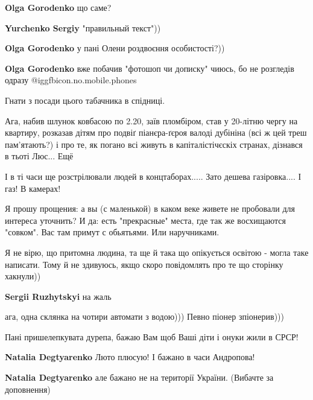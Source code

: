 \begin{itemize}
\begin{itemize} %
\textbf{Olga Gorodenko} що саме?

\textbf{Yurchenko Sergiy} "правильный текст"))

\textbf{Olga Gorodenko} у пані Олени роздвоєння особистості?))

\textbf{Olga Gorodenko} вже побачив "фотошоп чи дописку" чиюсь, бо не розгледів одразу  @igg{fbicon.no.mobile.phones} 
\end{itemize} %

 
Гнати з посади цього табачника в спідниці.

Ага, набив шлунок ковбасою по 2.20, заїв пломбіром, став у 20-літню чергу на квартиру, розказав дітям про подвіґ піанєра-ґєроя валоді дубініна (всі ж цей треш пам'ятають?) і про те, як погано всі живуть в капіталістічєскіх странах, дізнався в тьоті Люс... Ещё

І в ті часи ще розстрілювали людей в концтаборах..... Зато дешева газіровка.... І газ! В камерах!

Я прошу прощения: а вы (с маленькой) в каком веке живете не пробовали для интереса уточнить?
И да: есть "прекрасные" места, где так же восхищаются "совком". Вас там примут с обьятьями.
Или наручниками.

Я не вірю, що притомна людина, та ще й така що опікується освітою - могла таке написати. Тому й не здивуюсь, якщо скоро повідомлять про те що сторінку хакнули))

\textbf{Sergii Ruzhytskyi} на жаль

ага, одна склянка на чотири автомати з водою))) Певно піонер зпіонерив)))

Пані пришелепкувата дурепа, бажаю Вам щоб Ваші діти і онуки жили в СРСР!

\begin{itemize} %
\textbf{Natalia Degtyarenko}
Люто плюсую!
І бажано в часи Андропова!

\textbf{Natalia Degtyarenko} але бажано не на території України. (Вибачте за доповнення)


\end{itemize}
\end{itemize}
